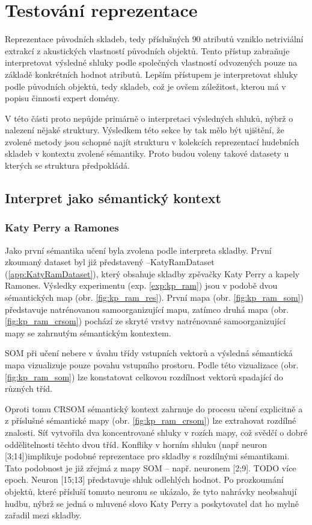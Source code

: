 \documentclass[thesis=M,czech]{FITthesis}[2012/06/26]
\begin{document}
\section{Testování reprezentace}
Reprezentace původních skladeb, tedy příslušných $90$ atributů vzniklo netriviální extrakcí z akustických vlastností původních objektů. Tento přístup zabraňuje interpretovat výsledné shluky podle společných vlastností odvozených pouze na základě konkrétních hodnot atributů. Lepším přístupem je interpretovat shluky podle původních objektů, tedy skladeb, což je ovšem záležitost, kterou má v popisu činnosti expert domény.

V této části proto nepůjde primárně o interpretaci výsledných shluků, nýbrž o nalezení nějaké struktury. Výsledkem této sekce by tak mělo být ujištění, že zvolené metody jsou schopné najít strukturu v kolekcích reprezentací hudebních skladeb v kontextu zvolené sémantiky. Proto budou voleny takové datasety u kterých se struktura předpokládá.



\subsection{Interpret jako sémantický kontext}
\subsubsection*{Katy Perry a Ramones}
Jako první sémantika učení byla zvolena podle interpreta skladby. První zkoumaný dataset byl již představený --KatyRamDataset (\ref{app:KatyRamDataset}), který obsahuje skladby zpěvačky Katy Perry a kapely Ramones. Výsledky  experimentu (exp. \ref{exp:kp_ram}) jsou v podobě dvou sémantických map (obr. \ref{fig:kp_ram_res}). První mapa (obr. \ref{fig:kp_ram_som}) představuje natrénovanou samoorganizující mapu, zatímco druhá mapa (obr. \ref{fig:kp_ram_crsom}) pochází ze skryté vrstvy natrénované samoorganizující mapy se zahrnutým sémantickým kontextem.

	SOM při učení nebere v úvahu třídy vstupních vektorů a výsledná sémantická mapa vizualizuje pouze povahu vstupního prostoru. Podle této vizualizace (obr. \ref{fig:kp_ram_som}) lze konstatovat celkovou rozdílnost vektorů spadající do různých tříd.
	
	Oproti tomu CRSOM sémantický kontext zahrnuje do procesu učení explicitně a z příslušné sémantické mapy (obr. \ref{fig:kp_ram_crsom}) lze extrahovat rozdílné znalosti. Síť vytvořila dva koncentrované shluky v rozích mapy, což svědčí o dobré oddělitelnosti těchto dvou tříd. Konfliky v horním shluku (např neuron [3;14])implikuje podobné reprezentace pro skladby s rozdílnými sémantikami. Tato podobnost je již zřejmá z mapy SOM -- např. neuronem [2;9].  TODO více epoch. Neuron [15;13] představuje shluk odlehlých hodnot. Po prozkoumání objektů, které přísluší tomuto neuronu se ukázalo, že tyto nahrávky neobsahují hudbu, nýbrž se jedná o mluvené slovo Katy Perry a poskytovatel dat ho mylně zařadil mezi skladby.
\end{document}
